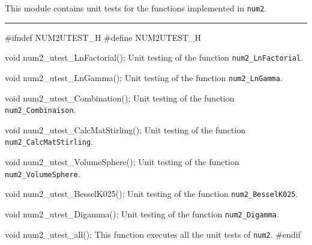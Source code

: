 
This module contains unit tests for the functions implemented in {\tt num2}. 

\bigskip
\hrule
\code
\hide
#ifndef NUM2UTEST_H
#define NUM2UTEST_H
\endhide
\endcode

\code
void num2_utest_LnFactorial();
\endcode
 \tab  Unit testing of the function {\tt num2\_LnFactorial}.
 \endtab
\code

void num2_utest_LnGamma();
\endcode
 \tab  Unit testing of the function {\tt num2\_LnGamma}.
 \endtab
\code

void num2_utest_Combination();
\endcode
 \tab  Unit testing of the function {\tt num2\_Combinaison}.
 \endtab
\code

void num2_utest_CalcMatStirling();
\endcode
 \tab  Unit testing of the function {\tt num2\_CalcMatStirling}.
 \endtab
\code

void num2_utest_VolumeSphere();
\endcode
 \tab  Unit testing of the function {\tt num2\_VolumeSphere}.
 \endtab
\code

void num2_utest_BesselK025();
\endcode
 \tab  Unit testing of the function {\tt num2\_BesselK025}.
 \endtab
\code

void num2_utest_Digamma();
\endcode
 \tab  Unit testing of the function {\tt num2\_Digamma}.
 \endtab
\code

void num2_utest_all();
\endcode
 \tab  This function executes all the unit tests of {\tt num2}.
 \endtab
\code\hide
#endif
\endhide
\endcode
